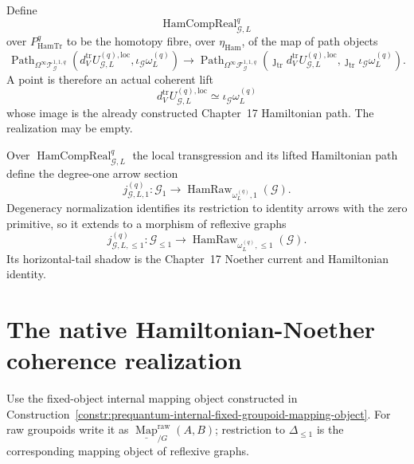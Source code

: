 \begin{definition}
\label{def:prequantum-hamiltonian-transgression-comparison-realization}
Define
\[
\boxed{
\operatorname{HamCompReal}_{\mathcal G,L}^{q}
}
\]
over $P_{\mathrm{HamTr}}^q$ to be the homotopy fibre, over
$\eta_{\mathrm{Ham}}$, of the map of path objects
\[
\operatorname{Path}_{\Omega^\infty\mathscr T_{\mathcal G}^{1,1,q}}
\left(
 d_V^{\mathrm{tr}}U_{\mathcal G,L}^{(q),\mathrm{loc}},
 \iota_{\mathcal G}\omega_L^{(q)}
\right)
\longrightarrow
\operatorname{Path}_{\Omega^\infty\mathscr F_{\mathcal G}^{1,1,q}}
\left(
 \jmath_{\mathrm{tr}}d_V^{\mathrm{tr}}U_{\mathcal G,L}^{(q),\mathrm{loc}},
 \jmath_{\mathrm{tr}}\iota_{\mathcal G}\omega_L^{(q)}
\right).
\]
A point is therefore an actual coherent lift
\[
\boxed{
d_V^{\mathrm{tr}}U_{\mathcal G,L}^{(q),\mathrm{loc}}
\simeq
\iota_{\mathcal G}\omega_L^{(q)}
}
\]
whose image is the already constructed Chapter~17 Hamiltonian path.  The
realization may be empty.
\end{definition}

Over $\operatorname{HamCompReal}_{\mathcal G,L}^{q}$ the local transgression and
its lifted Hamiltonian path define the degree-one arrow section
\[
\boxed{
j^{(q)}_{\mathcal G,L,1}:
\mathcal G_1
\longrightarrow
\operatorname{HamRaw}_{\omega_L^{(q)},1}(\mathcal G).
}
\]
Degeneracy normalization identifies its restriction to identity arrows with the
zero primitive, so it extends to a morphism of reflexive graphs
\[
j^{(q)}_{\mathcal G,L,\le1}:
\mathcal G_{\le1}
\longrightarrow
\operatorname{HamRaw}_{\omega_L^{(q)},\le1}(\mathcal G).
\]
Its horizontal-tail shadow is the Chapter~17 Noether current and Hamiltonian
identity.

\section{The native Hamiltonian-Noether coherence realization}
\label{sec:prequantum-hamiltonian-noether-coherence}

Use the fixed-object internal mapping object constructed in
Construction~\ref{constr:prequantum-internal-fixed-groupoid-mapping-object}.
For raw groupoids write it as
$\underline{\operatorname{Map}}^{\mathrm{raw}}_{/G}(A,B)$; restriction to
$\Delta_{\le1}$ is the corresponding mapping object of reflexive graphs.


